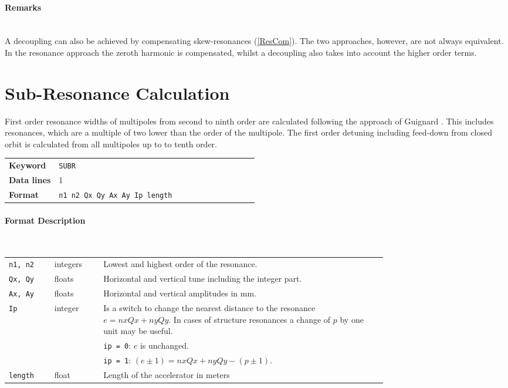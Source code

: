 \paragraph{Remarks}~\\

A decoupling can also be achieved by compensating skew-resonances (\ref{ResCom}).
The two approaches, however, are not always equivalent.
In the resonance approach the zeroth harmonic is compensated, whilst a decoupling also takes into account the higher order terms.

\section{Sub-Resonance Calculation} \label{SubCal}

First order resonance widths of multipoles from second to ninth order are calculated following the approach of Guignard \cite{Gilbert78}.
This includes resonances, which are a multiple of two lower than the order of the multipole.
The first order detuning including feed-down from closed orbit is calculated from all multipoles up to to tenth order.

\bigskip
\begin{tabular}{@{}lp{0.8\linewidth}}
    \textbf{Keyword}    & \texttt{SUBR}\index{SUBR} \\
    \textbf{Data lines} & 1 \\
    \textbf{Format}     & \texttt{n1 n2 Qx Qy Ax Ay Ip length}
\end{tabular}

\paragraph{Format Description}~

\bigskip
\begin{longtabu}{@{}llp{0.75\linewidth}}
    \texttt{n1, n2} & integers & Lowest and highest order of the resonance. \\
    \texttt{Qx, Qy} & floats   & Horizontal and vertical tune including the integer part. \\
    \texttt{Ax, Ay} & floats   & Horizontal and vertical amplitudes in mm. \\
    \texttt{Ip}     & integer  & Is a switch to change the nearest distance to the resonance \mbox{$e = nxQx + nyQy$.} In cases of structure resonances a change of $p$ by one unit may be useful. \\
                    &          & \texttt{ip = 0}: $e$ is unchanged. \\
                    &          & \texttt{ip = 1}: \mbox{$(e \pm 1) = nxQx + nyQy - (p \pm 1)$}. \\
    \texttt{length} & float    & Length of the accelerator in meters
\end{longtabu}

